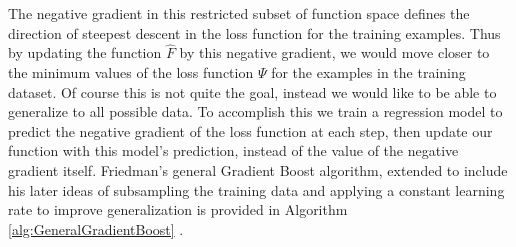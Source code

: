 \documentclass[runningheads]{llncs}
\begin{document}
The negative gradient in this restricted subset of function space defines the direction of steepest descent in the loss function for the training examples. Thus by updating the function \(\hat{F}\) by this negative gradient, we would move closer to the minimum values of the loss function \(\Psi\) for the examples in the training dataset. Of course this is not quite the goal, instead we would like to be able to generalize to all possible data. To accomplish this we train a regression model to predict the negative gradient of the loss function at each step, then update our function with this model's prediction, instead of the value of the negative gradient itself. Friedman's general Gradient Boost algorithm, extended to include his later ideas of subsampling the training data and applying a constant learning rate to improve generalization is provided in Algorithm \ref{alg:GeneralGradientBoost} \cite{2001Friedman} \cite{2002Friedman} \cite{2012ridgeway}. 
\end{document}
